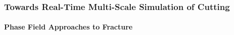 \documentclass{beamer}
\newcommand{\SectionZero}{Phase Field Approaches to Fracture}
\begin{document}
\begin{frame}
	\frametitle{Towards Real-Time Multi-Scale Simulation of Cutting}
	\framesubtitle{\SectionZero}
	\vspace{\baselineskip}		
		\begin{center}
		\end{center}
\end{frame}
\end{document}
